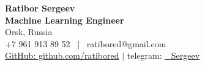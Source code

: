 \documentclass[letterpaper,12pt]{fed-res} %
\begin{document}
\begin{center}
    \textbf{\Huge Ratibor Sergeev} \\ \vspace{1pt}
    \textbf{Machine Learning Engineer} \\ \vspace{1pt}
    Orsk, Russia \\ \vspace{1pt}
    +7 961 913 89 52 \ $|$ \ ratibored@gmail.com \\ \vspace{1pt}
    \href{https://github.com/ratibored}{GitHub: github.com/ratibored} $|$ telegram: \href{https://t.me/Ratibor_Sergeev}{\@Ratibor\_Sergeev} \\ \vspace{1pt}
\end{center}







\end{document}

